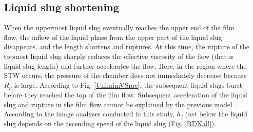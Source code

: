 \documentclass[aps,pre,preprint,groupedaddress,showkeys]{revtex4-2}
\begin{document}
\subsection{Liquid slug shortening}
When the uppermost liquid slug eventually reaches the upper end of the film flow, the inflow of the liquid phase from the upper part of the liquid slug disappears, and the length shortens and ruptures.
At this time, the rupture of the topmost liquid slug sharply reduces the effective viscosity of the flow (that is liquid slug length) and further accelerates the flow.
Here, in the region where the STW occurs, the pressure of the chamber does not immediately decrease because $ R_p $ is large.
According to Fig. \ref{UnimimVSpre}, the subsequent liquid slugs burst before they reached the top of the film flow.
Subsequent acceleration of the liquid slug and rupture in the film flow cannot be explained by the previous model \citep{kanno2018} .
According to the image analyses conducted in this study, $ h_f $ just below the liquid slug depends on the ascending speed of the liquid slug (Fig. \ref{RDKall}).
\end{document}
